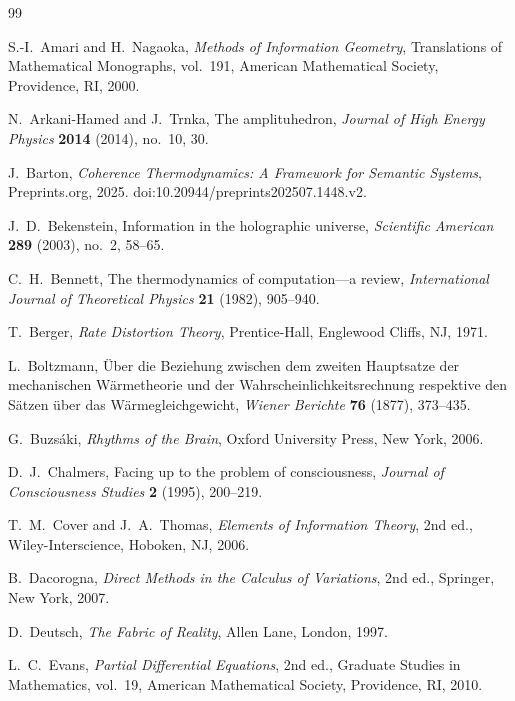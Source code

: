 \documentclass[12pt, oneside]{memoir}
\begin{document}
\renewcommand{\bibname}{References}
\begin{thebibliography}{99}

S.-I.~Amari and H.~Nagaoka,
\textit{Methods of Information Geometry},
Translations of Mathematical Monographs, vol.~191,
American Mathematical Society, Providence, RI, 2000.

N.~Arkani-Hamed and J.~Trnka,
The amplituhedron,
\textit{Journal of High Energy Physics} \textbf{2014} (2014), no.~10, 30.

J.~Barton,
\textit{Coherence Thermodynamics: A Framework for Semantic Systems},
Preprints.org, 2025.
doi:10.20944/preprints202507.1448.v2.

J.~D.~Bekenstein,
Information in the holographic universe,
\textit{Scientific American} \textbf{289} (2003), no.~2, 58--65.

C.~H.~Bennett,
The thermodynamics of computation---a review,
\textit{International Journal of Theoretical Physics} \textbf{21} (1982), 905--940.

T.~Berger,
\textit{Rate Distortion Theory},
Prentice-Hall, Englewood Cliffs, NJ, 1971.

L.~Boltzmann,
Über die Beziehung zwischen dem zweiten Hauptsatze der mechanischen Wärmetheorie und der
Wahrscheinlichkeitsrechnung respektive den Sätzen über das Wärmegleichgewicht,
\textit{Wiener Berichte} \textbf{76} (1877), 373--435.

G.~Buzsáki,
\textit{Rhythms of the Brain},
Oxford University Press, New York, 2006.

D.~J.~Chalmers,
Facing up to the problem of consciousness,
\textit{Journal of Consciousness Studies} \textbf{2} (1995), 200--219.

T.~M.~Cover and J.~A.~Thomas,
\textit{Elements of Information Theory},
2nd ed., Wiley-Interscience, Hoboken, NJ, 2006.

B.~Dacorogna,
\textit{Direct Methods in the Calculus of Variations},
2nd ed., Springer, New York, 2007.

D.~Deutsch,
\textit{The Fabric of Reality},
Allen Lane, London, 1997.

L.~C.~Evans,
\textit{Partial Differential Equations},
2nd ed., Graduate Studies in Mathematics, vol.~19,
American Mathematical Society, Providence, RI, 2010.


\end{thebibliography}
\end{document}
